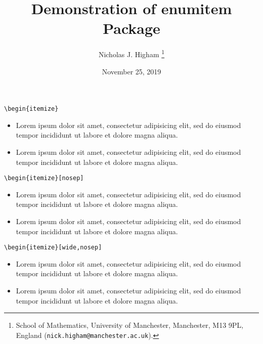 \documentclass[12pt]{article}
\title{Demonstration of enumitem Package}
\author{Nicholas J. Higham%
        \thanks{%
                School of Mathematics,
                University of Manchester,
                Manchester, M13 9PL, England
                (\texttt{nick.higham@manchester.ac.uk}).
               }
}
\date{November 25, 2019}
\begin{document}
\thispagestyle{empty}
\maketitle

\begin{verbatim}
\begin{itemize}
\end{verbatim}
\begin{itemize}

\item 
Lorem ipsum dolor sit amet, consectetur adipisicing elit, sed do
eiusmod tempor incididunt ut labore et dolore magna aliqua. 

\item 
Lorem ipsum dolor sit amet, consectetur adipisicing elit, sed do
eiusmod tempor incididunt ut labore et dolore magna aliqua. 

\end{itemize}

\begin{verbatim}
\begin{itemize}[nosep]
\end{verbatim}
\begin{itemize}[nosep]

\item 
Lorem ipsum dolor sit amet, consectetur adipisicing elit, sed do
eiusmod tempor incididunt ut labore et dolore magna aliqua. 

\item 
Lorem ipsum dolor sit amet, consectetur adipisicing elit, sed do
eiusmod tempor incididunt ut labore et dolore magna aliqua. 

\end{itemize}

\begin{verbatim}
\begin{itemize}[wide,nosep]
\end{verbatim}
\begin{itemize}[wide,nosep]

\item 
Lorem ipsum dolor sit amet, consectetur adipisicing elit, sed do
eiusmod tempor incididunt ut labore et dolore magna aliqua. 

\item 
Lorem ipsum dolor sit amet, consectetur adipisicing elit, sed do
eiusmod tempor incididunt ut labore et dolore magna aliqua. 

\end{itemize}
\end{document}
